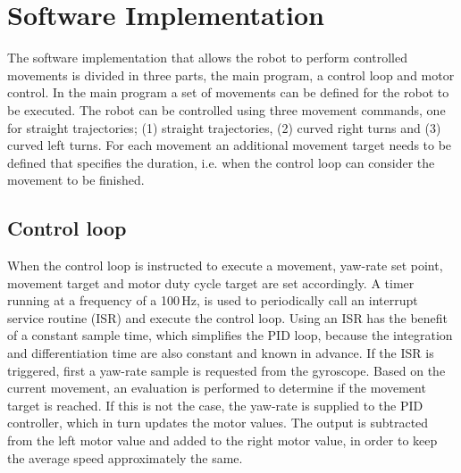 


\section{Software Implementation}
\label{sec:dai_software_implementation}

The software implementation that allows the robot to perform controlled movements is divided in three parts, the main program, a control loop and motor control.
In the main program a set of movements can be defined for the robot to be executed.
The robot can be controlled using three movement commands, one for straight trajectories; (1) straight trajectories, (2) curved right turns and (3) curved left turns.
For each movement an additional movement target needs to be defined that specifies the duration, i.e. when the control loop can consider the movement to be finished.

\subsection{Control loop}

When the control loop is instructed to execute a movement, yaw-rate set point, movement target and motor duty cycle target are set accordingly.
A timer running at a frequency of a 100\,Hz, is used to periodically call an interrupt service routine (ISR) and execute the control loop.
Using an ISR has the benefit of a constant sample time, which simplifies the PID loop, because the integration and differentiation time are also constant and known in advance.
If the ISR is triggered, first a yaw-rate sample is requested from the gyroscope.
Based on the current movement, an evaluation is performed to determine if the movement target is reached.
If this is not the case, the yaw-rate is supplied to the PID controller, which in turn updates the motor values.
The output is subtracted from the left motor value and added to the right motor value, in order to keep the average speed approximately the same.

